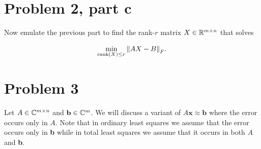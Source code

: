 \newpage
\section{Problem 2, part c}
Now emulate the previous part to find the rank-$r$ matrix $X \in \mathbb{R}^{m \times n}$ that solves 

\[
\min_{\text{rank}(X) \leq r}\norm{AX - B}_F.
\]
\newpage
\section{Problem 3}
Let $A \in \mathbb{C}^{m\times n}$ and $\textbf{b} \in \mathbb{C}^m$. We will discuss a variant of $A\textbf{x} \approx \textbf{b}$ where the error occurs only in $A$. Note that in ordinary least squares we assume that the error occurs only in \textbf{b} while in total least squares we assume that it occurs in both $A$ and \textbf{b}.

